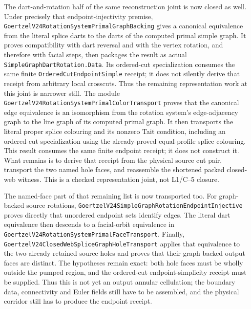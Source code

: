 \documentclass[11pt]{article}
\theoremstyle{definition}
\begin{document}
The dart-and-rotation half of the same reconstruction joint is now closed as
well.  Under precisely that endpoint-injectivity premise,
\texttt{GoertzelV24RotationSystemPrimalGraphBacking} gives a canonical
equivalence from the literal splice darts to the darts of the computed primal
simple graph.  It proves compatibility with dart reversal and with the vertex
rotation, and therefore with facial steps, then packages the result as actual
\texttt{SimpleGraphDartRotation.Data}.  Its ordered-cut specialization consumes
the same finite \texttt{OrderedCutEndpointSimple} receipt; it does not silently
derive that receipt from arbitrary local crosscuts.  Thus the remaining
representation work at this joint is narrower still.  The module
\texttt{GoertzelV24RotationSystemPrimalColorTransport} proves that the
canonical edge equivalence is an isomorphism from the rotation system's
edge-adjacency graph to the line graph of its computed primal graph.  It then
transports the literal proper splice colouring and its nonzero Tait condition,
including an ordered-cut specialization using the already-proved equal-profile
splice colouring.  This result consumes the same finite endpoint receipt; it
does not construct it.  What remains is to derive that receipt from the
physical source cut pair, transport the two named hole faces, and reassemble
the shortened packed closed-web witness.  This is a checked representation
joint, not L1/C--5 closure.

The named-face part of that remaining list is now transported too.
For graph-backed source rotations,
\texttt{GoertzelV24SimpleGraphRotationEndpointInjective} proves directly that
unordered endpoint sets identify edges.  The literal dart equivalence then
descends to a facial-orbit equivalence in
\texttt{GoertzelV24RotationSystemPrimalFaceTransport}.  Finally,
\texttt{GoertzelV24ClosedWebSpliceGraphHoleTransport} applies that equivalence
to the two already-retained source holes and proves that their graph-backed
output faces are distinct.  The hypotheses remain exact: both hole faces must
be wholly outside the pumped region, and the ordered-cut endpoint-simplicity
receipt must be supplied.  Thus this is not yet an output annular cellulation;
the boundary data, connectivity and Euler fields still have to be assembled,
and the physical corridor still has to produce the endpoint receipt.
\end{document}
